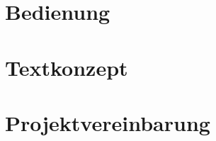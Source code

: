 \documentclass{fhnwreport/fhnwreport}
\begin{document}
\clearpage
\section{Bedienung}
\label{sec:bedienung}


\clearpage
\section{Textkonzept}
\label{sec:testkonzept}


%


\clearpage
{}
{}
{}

\clearpage
\section*{Projektvereinbarung}
\label{sec:projektvereinbarung}

\end{document}
